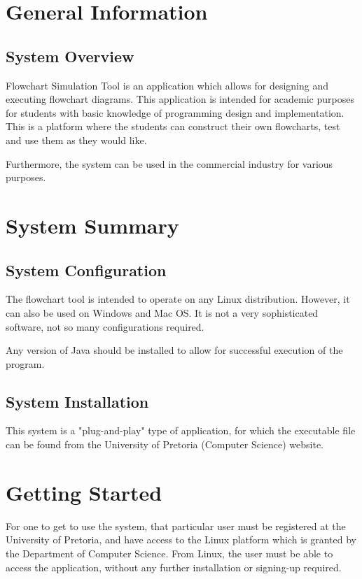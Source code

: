 \documentclass[11pt,a4paper,titlepage]{article}
\begin{document}

\newpage
\tableofcontents
{}
\newpage
{}
\section{General Information}
	\subsection{System Overview}
	
		Flowchart Simulation Tool is an application which allows for designing and executing flowchart diagrams. This application is intended for academic purposes for students with basic knowledge of programming design and implementation. This is a platform where the students can construct their own flowcharts, test and use them as they would like. \newline
		
		Furthermore, the system can be used in the commercial industry for various purposes.
		
\section{System Summary}
	\subsection{System Configuration}
		
		The flowchart tool is intended to operate on any Linux distribution. However, it can also be used on Windows and Mac OS. It is not a very sophisticated software, not so many configurations required.
		
		Any version of Java should be installed to allow for successful execution of the program. 
		
		\subsection{System Installation}
		
		This system is a "plug-and-play" type of application, for which the executable file can be found from the University of Pretoria (Computer Science) website.
		

\section{Getting Started}
	
	For one to get to use the system, that particular user must be registered at the University of Pretoria, and have access to the Linux platform which is granted by the Department of Computer Science. From Linux, the user must be able to access the application, without any further installation or signing-up required.
\end{document}
